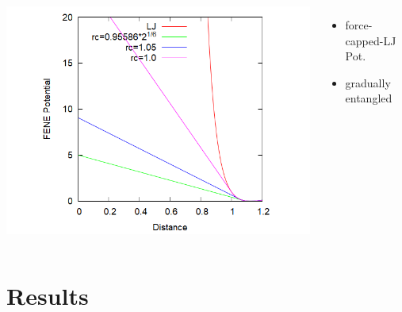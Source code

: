 \documentclass[12pt, dvipdfmx]{beamer}
\begin{document}
\begin{frame}
\begin{columns}[T, onlytextwidth]
\begin{center}
					\includegraphics[width=1.2\textwidth]{Ev_fcLJ.png}
				\end{center}
				\vspace{-3mm}
				\scriptsize
				\begin{itemize}
					\item force-capped-LJ Pot.
					\item gradually entangled
				\end{itemize}
		\end{columns}

\end{frame}

\section{Results}
\end{document}

